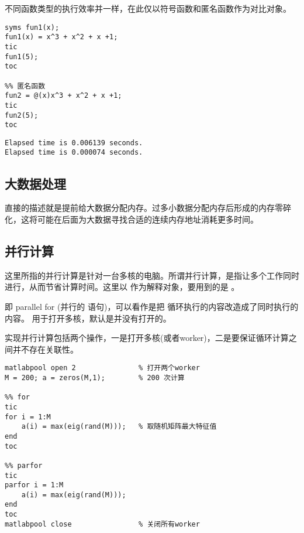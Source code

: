 不同函数类型的执行效率并一样，在此仅以符号函数和匿名函数作为对比对象。

\vspace{-0.8cm}
\begin{lstlisting}[caption = 不同函数类型效率对比]
%% 符号函数
syms fun1(x);
fun1(x) = x^3 + x^2 + x +1;
tic
fun1(5);
toc

%% 匿名函数
fun2 = @(x)x^3 + x^2 + x +1;
tic
fun2(5);
toc
\end{lstlisting}

\vspace{-0.8cm}
\begin{lstlisting}
Elapsed time is 0.006139 seconds.
Elapsed time is 0.000074 seconds.
\end{lstlisting}





\subsection{大数据处理}

直接的描述就是提前给大数据分配内存。过多小数据分配内存后形成的内存零碎化，这将可能在后面为大数据寻找合适的连续内存地址消耗更多时间。





\subsection{并行计算}

这里所指的并行计算是针对一台多核的电脑。所谓并行计算，是指让多个工作同时进行，从而节省计算时间。这里以  作为解释对象，要用到的是 。\par

 即 parallel for (并行的  语句)，可以看作是把  循环执行的内容改造成了同时执行的内容。  用于打开多核，默认是并没有打开的。\par

实现并行计算包括两个操作，一是打开多核(或者worker)，二是要保证循环计算之间并不存在关联性。

\vspace{-0.8cm}
\begin{lstlisting}[caption = 并行计算parfor与for效率对比]
matlabpool open 2               % 打开两个worker
M = 200; a = zeros(M,1);        % 200 次计算

%% for
tic  
for i = 1:M        
    a(i) = max(eig(rand(M)));   % 取随机矩阵最大特征值
end 
toc

%% parfor
tic  
parfor i = 1:M 
    a(i) = max(eig(rand(M))); 
end 
toc
matlabpool close                % 关闭所有worker
\end{lstlisting}

